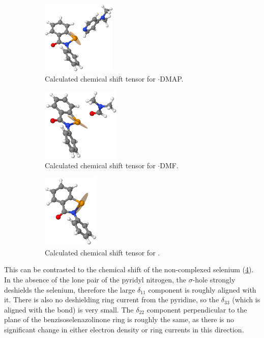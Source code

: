 \begin{refsection}
\begin{figure}
  \centering
  \begin{subfigure}{0.3\linewidth}
    \centering
    \includegraphics[height=3.5cm]{Figures/77se-tensor-ebs-dmap.png}
    \caption{Calculated chemical shift tensor for $\cdot$DMAP.}
    \label{fig:77se-tensor-ebs-dmap}
  \end{subfigure}
  \begin{subfigure}{0.3\linewidth}
    \centering
    \includegraphics[height=3.5cm]{Figures/77se-tensor-ebs-dmf.png}
    \caption{Calculated chemical shift tensor for $\cdot$DMF.}
    \label{fig:77se-tensor-ebs-dmf}
  \end{subfigure}
  \begin{subfigure}{0.3\linewidth}
    \centering
    \includegraphics[height=3.5cm]{Figures/77se-tensor-ebs.png}
    \caption{Calculated chemical shift tensor for .}
    \label{fig:77se-tensor-ebs}
  \end{subfigure}
  \caption[Calculated chemical shift tensors for ebselen derivatives.]{}
\end{figure}

This can be contrasted to the chemical shift of the non-complexed selenium (\cref{fig:77se-tensor-ebs}).
In the absence of the lone pair of the pyridyl nitrogen, the $\sigma$-hole strongly deshields the selenium, therefore the large $\delta_{11}$ component is roughly aligned with it.
There is also no deshielding ring current from the pyridine, so the $\delta_{33}$ (which is aligned with the  bond) is very small.
The $\delta_{22}$ component perpendicular to the plane of the benzisoselenazolinone ring is roughly the same, as there is no significant change in either electron density or ring currents in this direction.


\end{refsection}
